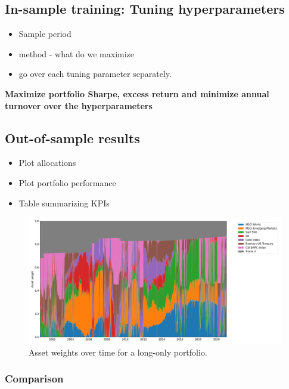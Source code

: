 \subsection{In-sample training: Tuning hyperparameters}

\begin{itemize}
    \item Sample period
    \item method - what do we maximize
    \item go over each tuning parameter separately.
\end{itemize}

\textbf{Maximize portfolio Sharpe, excess return and minimize annual turnover over the hyperparameters}

\subsection{Out-of-sample results}

\begin{itemize}
    \item Plot allocations
    \item Plot portfolio performance
    \item Table summarizing KPIs
\end{itemize}

\begin{figure}[H]
    \centering
    \includegraphics[width=1\textwidth]{analysis/portfolio_exercise/images/port_weights.png}
    \caption{Asset weights over time for a long-only portfolio.}
    \label{fig:MPC_port_weights}
\end{figure}




\subsubsection{Comparison}



